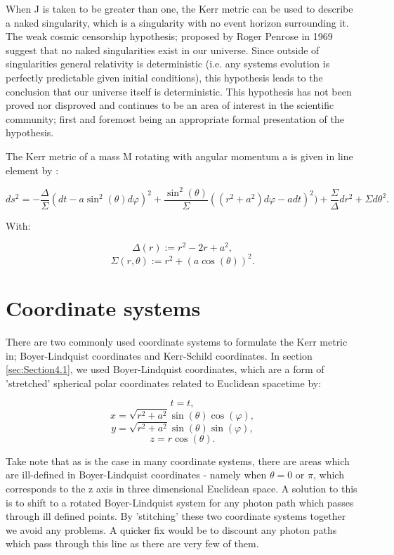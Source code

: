 \documentclass[oneside,openright,frontopenright, singlespacing]{dmathesis}
\begin{document}
\vspace{1em}
	When J is taken to be greater than one, the Kerr metric can be used to describe a naked singularity, which is a singularity with no event horizon surrounding it. The weak cosmic censorship hypothesis; proposed by Roger Penrose in 1969 suggest that no naked singularities exist in our universe. Since outside of singularities general relativity is deterministic (i.e. any systems evolution is perfectly predictable given initial conditions), this hypothesis leads to the conclusion that our universe itself is deterministic. This hypothesis has not been proved nor disproved and continues to be an area of interest in the scientific community; first and foremost being an appropriate formal presentation of the hypothesis.

\vspace{1em}
	The Kerr metric of a mass M rotating with angular momentum a is given in line element by \cite{raquepas2017topics}:

	\[{ds^{2} = -\frac{\Delta}{\Sigma}(dt-a\sin^2(\theta)d\varphi)^2+\frac{\sin^2(\theta)}{\Sigma}((r^2+a^2)d\varphi-adt)^2)+\frac{\Sigma}{\Delta}dr^2+\Sigma d\theta^2}.\]

\vspace{1em}
	With:
	
	\[\Delta(r) := r^2 - 2r + a^2,\]
	\[\Sigma(r, \theta) := r^2 +(a\cos(\theta))^2.\]

\section{Coordinate systems}\label{sec:Section4.2}

	There are two commonly used coordinate systems to formulate the Kerr metric in; Boyer-Lindquist coordinates\cite{boyer1967maximal} and Kerr-Schild coordinates\cite{debney1969solutions}. In section \ref{sec:Section4.1}, we used Boyer-Lindquist coordinates, which are a form of 'stretched' spherical polar coordinates related to Euclidean spacetime by:

	\[t=t,\]
	\[x = \sqrt{r^2+a^2}\sin(\theta)\cos(\varphi),\]
	\[y = \sqrt{r^2+a^2}\sin(\theta)\sin(\varphi),\]
	\[z = r\cos(\theta).\]

\vspace{1em}
	Take note that as is the case in many coordinate systems, there are areas which are ill-defined in Boyer-Lindquist coordinates - namely when $\theta = 0\mbox{ or }\pi$, which corresponds to the z axis in three dimensional Euclidean space. A solution to this is to shift to a rotated Boyer-Lindquist system for any photon path which passes through ill defined points. By 'stitching' these two coordinate systems together we avoid any problems. A quicker fix would be to discount any photon paths which pass through this line as there are very few of them.
\end{document}
